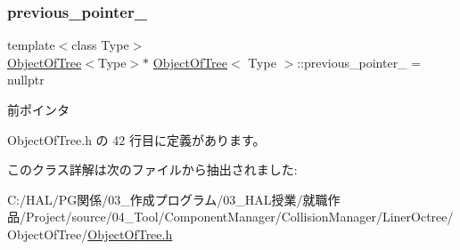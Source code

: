 \subsubsection{\texorpdfstring{previous\+\_\+pointer\+\_\+}{previous\_pointer\_}}
{\footnotesize\ttfamily template$<$class Type$>$ \\
\mbox{\hyperlink{class_object_of_tree}{Object\+Of\+Tree}}$<$Type$>$$\ast$ \mbox{\hyperlink{class_object_of_tree}{Object\+Of\+Tree}}$<$ Type $>$\+::previous\+\_\+pointer\+\_\+ = nullptr\hspace{0.3cm}{\ttfamily [private]}}



前ポインタ 



 Object\+Of\+Tree.\+h の 42 行目に定義があります。



このクラス詳解は次のファイルから抽出されました\+:\begin{DoxyCompactItemize}
\item 
C\+:/\+H\+A\+L/\+P\+G関係/03\+\_\+作成プログラム/03\+\_\+\+H\+A\+L授業/就職作品/\+Project/source/04\+\_\+\+Tool/\+Component\+Manager/\+Collision\+Manager/\+Liner\+Octree/\+Object\+Of\+Tree/\mbox{\hyperlink{_object_of_tree_8h}{Object\+Of\+Tree.\+h}}\end{DoxyCompactItemize}

